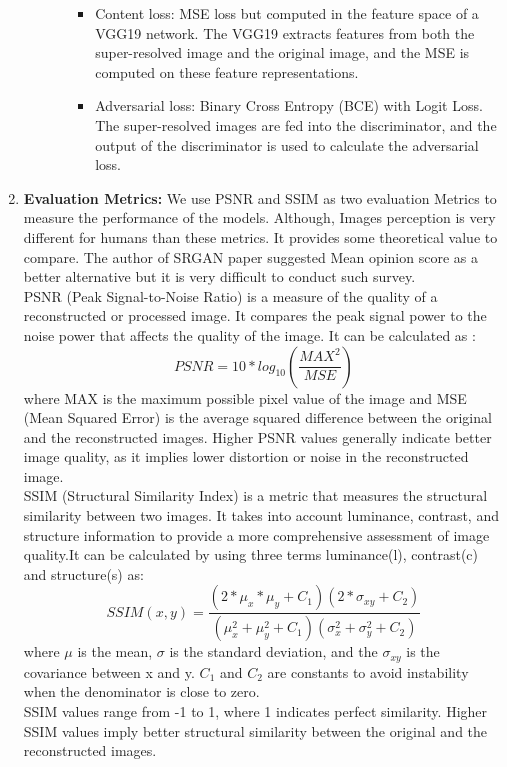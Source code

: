 \begin{enumerate}
\begin{enumerate}
\begin{enumerate}
\begin{itemize}
                \item Content loss: MSE loss but computed in the feature space of a VGG19 network. The VGG19 extracts features from both the super-resolved image and the original image, and the MSE is computed on these feature representations.
                \item Adversarial loss: Binary Cross Entropy (BCE) with Logit Loss. The super-resolved images are fed into the discriminator, and the output of the discriminator is used to calculate the adversarial loss.
            \end{itemize}
        \end{enumerate}
    \end{enumerate}
    \item {\bf Evaluation Metrics:} We use PSNR and SSIM as two evaluation Metrics to measure the performance of the models. Although, Images perception is very different for humans than these metrics. It provides some theoretical value to compare. The author of SRGAN paper suggested Mean opinion score as a better alternative but it is very difficult to conduct such survey.\\
    PSNR (Peak Signal-to-Noise Ratio) is a measure of the quality of a reconstructed or processed image. It compares the peak signal power to the noise power that affects the quality of the image. It can be calculated as :
    $$PSNR = 10*log_{10}(\frac{MAX^{2}}{MSE})$$
    where MAX is the maximum possible pixel value of the image and MSE (Mean Squared Error) is the average squared difference between the original and the reconstructed images. Higher PSNR values generally indicate better image quality, as it implies lower distortion or noise in the reconstructed image.\\
    SSIM (Structural Similarity Index) is a metric that measures the structural similarity between two images. It takes into account luminance, contrast, and structure information to provide a more comprehensive assessment of image quality.It can be calculated by using three terms luminance(l), contrast(c) and structure(s) as:
    $$SSIM(x,y)= \frac{(2*\mu _x*\mu _y+C_1)(2*\sigma_{xy}+C_2)}{(\mu_x^2+\mu_y^2+C_1)(\sigma_x^2+\sigma_y^2+C_2)}$$
    where $\mu$ is the mean, $\sigma$ is the standard deviation, and the $\sigma_{xy}$ is the covariance between x and y. $C_1$ and $C_2$ are constants to avoid instability when the denominator is close to zero. \\
    SSIM values range from -1 to 1, where 1 indicates perfect similarity. Higher SSIM values imply better structural similarity between the original and the reconstructed images.
\end{enumerate}